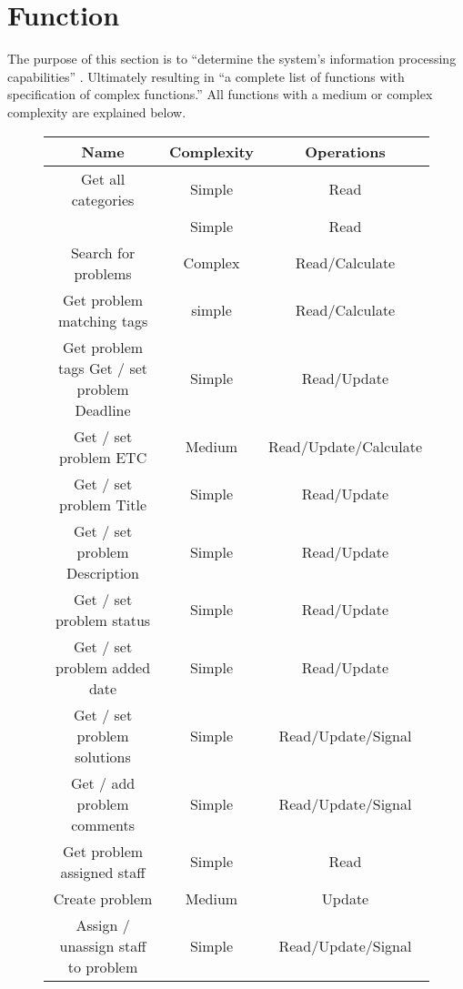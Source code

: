 \section{Function}
\label{sec:function}

The purpose of this section is to ``determine the system's information processing capabilities'' \cite[p.~137]{roedeaalborg}. Ultimately resulting in ``a complete list of functions with specification of complex functions.'' \cite[p.~137]{roedeaalborg} 
All functions with a medium or complex complexity are explained below.



\begin{figure}[hpt] %
\begin{center}
\begin{tabular}{|c|c|c|}
\hline
\textbf{Name}								&\textbf{Complexity} & \textbf{Operations}   \\ \hline%
Get all categories 					&   Simple & Read   \\ \hline%
				&   Simple & Read   \\ \hline%
Search for problems 				&   Complex & Read/Calculate   \\ \hline%
Get problem matching tags 	&   simple & Read/Calculate   \\ \hline%
Get problem tags 		
Get / set problem Deadline 	&   Simple & Read/Update  \\ \hline%
Get / set problem ETC 			&   Medium & Read/Update/Calculate   \\ \hline%
Get / set problem Title 		&   Simple & Read/Update   \\ \hline%
Get / set problem Description & Simple & Read/Update   \\ \hline%
Get / set problem status 		&   Simple & Read/Update   \\ \hline%
Get / set problem added date & Simple & Read/Update   \\ \hline%
Get / set problem solutions &   Simple & Read/Update/Signal   \\ \hline%
Get / add problem comments 	&   Simple & Read/Update/Signal   \\ \hline%
Get problem assigned staff 	&   Simple & Read   \\ \hline%
Create problem 							&   Medium & Update   \\ \hline%
Assign / unassign  staff to problem 	&   Simple & Read/Update/Signal   \\ \hline%

\end{tabular}
\end{center}
\end{figure}
